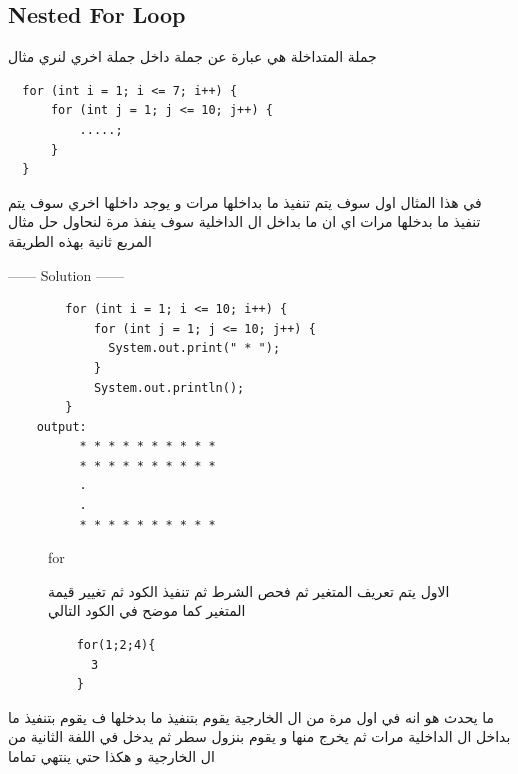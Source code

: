 \subsection{Nested For Loop}
\begin{AR}
  جملة  المتداخلة هي عبارة عن جملة  داخل جملة  اخري 
  لنري مثال
\end{AR}
\begin{verbatim}
  for (int i = 1; i <= 7; i++) {
      for (int j = 1; j <= 10; j++) {
          .....;
      }
  }
\end{verbatim}
\begin{AR}
  في هذا المثال اول  سوف يتم تنفيذ ما بداخلها  مرات و يوجد داخلها  اخري سوف يتم تنفيذ ما بدخلها 
   مرات 
  اي ان ما بداخل ال  الداخلية سوف ينفذ  مرة 
  لنحاول حل مثال المربع ثانية بهذه الطريقة 
\end{AR}
\begin{minipage}[h]{1\textwidth}
\begin{example}
  \begin{center}
    ------ \textcolor{Solution}{Solution} ------ 
  \end{center} 

  \begin{verbatim}
        for (int i = 1; i <= 10; i++) {
            for (int j = 1; j <= 10; j++) {
              System.out.print(" * ");
            }
            System.out.println();
        }
    output:
          * * * * * * * * * *
          * * * * * * * * * *
          .
          .
          * * * * * * * * * *
  \end{verbatim}
\end{example}
\end{minipage}
\begin{figure}[b]
  \begin{minipage}[h]{1\textwidth}
  \begin{enrichment*}{for}
  \begin{AR}
    الاول يتم تعريف المتغير ثم فحص الشرط ثم تنفيذ الكود ثم تغيير قيمة المتغير كما موضح في الكود التالي
  \end{AR}
  \par
  \begin{verbatim}
    for(1;2;4){
      3
    }
  \end{verbatim}
\end{enrichment*}
\end{minipage}
\end{figure}
\begin{minipage}[h]{1\textwidth}
\begin{AR}
  ما يحدث هو انه في اول مرة من ال  الخارجية يقوم بتنفيذ ما بدخلها ف يقوم بتنفيذ ما بداخل ال  الداخلية  مرات ثم يخرج منها و يقوم بنزول سطر ثم يدخل في اللفة الثانية من ال  الخارجية 
  و هكذا حتي ينتهي تماما 
\end{AR}
\end{minipage}


